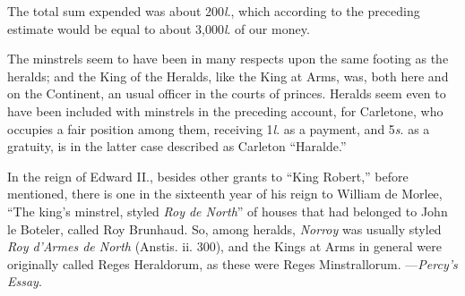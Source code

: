 The total sum expended was about 200\textit{l}., which according to the preceding
estimate would be equal to about 3,000\textit{l}. of our money.

The minstrels seem to have been in many respects upon the same footing as the
heralds; and the King of the Heralds, like the King at Arms, was, both here and
on the Continent, an usual officer in the courts of princes. Heralds seem even to
have been included with minstrels in the preceding account, for Carletone, who
occupies a fair position among them, receiving 1\textit{l}. as a payment, and 5\textit{s}. as a
gratuity, is in the latter case described as Carleton “Haralde.”

In the reign of Edward II., besides other grants to “King Robert,” before
mentioned, there is one in the sixteenth year of his reign to William de Morlee,
“The king’s minstrel, styled \textit{Roy de North}” of houses that had belonged to
John le Boteler, called Roy Brunhaud. So, among heralds, \textit{Norroy} was usually
styled \textit{Roy d'Armes de North} (Anstis. ii. 300), and the Kings at Arms in general
were originally called Reges Heraldorum, as these were Reges Minstrallorum.
—\textit{Percy's Essay}.

